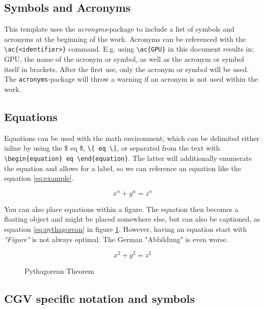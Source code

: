 \subsection{Symbols and Acronyms}
\label{texbas:acr}
This template uses the \emph{acronyms}-package to include a list of symbols and acronyms at the beginning of the work. Acronyms can be referenced with the \texttt{\textbackslash ac\{<identifier>\}} command. E.g. using \texttt{\textbackslash ac\{GPU\}} in this document results in: \ac{GPU}, the name of the acronym or symbol, as well as the acronym or symbol itself in brackets. After the first use, only the acronym or symbol will be used. The \texttt{acronyms}-package will throw a warning if an acronym is not used within the work.


\subsection{Equations}
\label{texbas:eq}
Equations can be used with the math environment, which can be delimited either inline by using the \$ eq \$, \texttt{\textbackslash [ eq \textbackslash ]}, or separated from the text with \texttt{\textbackslash begin\{equation\} eq \textbackslash end\{equation\}}. The latter will additionally enumerate the equation and allows for a label, so we can reference an equation like the equation \ref{eq:example}.


\begin{equation}
	 x^n + y^n = z^n
	\label{eq:example}
\end{equation}

You can also place equations within a figure. The equation then becomes a floating object and might be placed somewhere else, but can also be captioned, as equation \ref{eq:pythagorean} in figure \ref{fig:pythagorean}. However, having an equation start with \emph{"Figure"} is not always optimal. The German "Abbildung" is even worse.

\begin{figure}[hb]
	\begin{equation}
		x^2 + y^2 = z^2
		\label{eq:pythagorean}
	\end{equation}
	\caption{Pythagorean Theorem}
	\label{fig:pythagorean}
\end{figure}

\subsection*{CGV specific notation and symbols}

